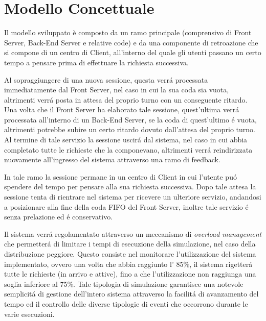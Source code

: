 
\chapter{Modello Concettuale}
 	\label{cap:modello concettuale}

Il modello sviluppato è composto da un ramo principale (comprensivo di Front Server, Back-End Server e relative code) e da una componente di retroazione che si compone di un centro di Client, all'interno del quale gli utenti passano un certo tempo a pensare prima di effettuare la richiesta
successiva.

Al sopraggiungere di una nuova sessione, questa verr\'a processata immediatamente dal Front Server, nel caso in cui la sua coda sia vuota, altrimenti verr\'a posta in attesa del proprio turno con un conseguente ritardo. Una volta che il Front Server ha elaborato tale sessione, quest'ultima verr\'a processata all'interno di un Back-End Server, se la coda di quest'ultimo \'e vuota, altrimenti potrebbe subire un certo ritardo dovuto dall'attesa del proprio turno. Al termine di tale servizio la sessione uscir\'a dal sistema, nel caso in cui abbia completato tutte le richieste che la componevano, altrimenti verr\'a reindirizzata nuovamente all'ingresso del sistema attraverso una ramo di feedback.

In tale ramo la sessione permane in un centro di Client in cui l'utente pu\'o spendere del tempo per pensare alla sua richiesta successiva. Dopo tale attesa la sessione tenta di rientrare nel sistema per ricevere un ulteriore servizio, andandosi a posizionare alla fine della coda FIFO del Front Server, inoltre tale servizio \'e senza prelazione ed \'e conservativo.

Il sistema verr\'a regolamentato attraverso un meccanismo di \textit{overload management} che permetter\'a di limitare i tempi di esecuzione della simulazione, nel caso della distribuzione peggiore. Questo consiste nel monitorare l'utilizzazione del sistema implementato, ovvero una volta che abbia raggiunto l' 85\%, il sistema rigetter\'a tutte le richieste (in arrivo e attive), fino a che l'utilizzazione non raggiunga una soglia inferiore al 75\%. Tale tipologia di simulazione garantisce una notevole semplicit\'a di gestione dell'intero sistema attraverso la facilit\'a di avanzamento del tempo ed il controllo delle diverse tipologie di eventi che occorrono durante le varie esecuzioni.

